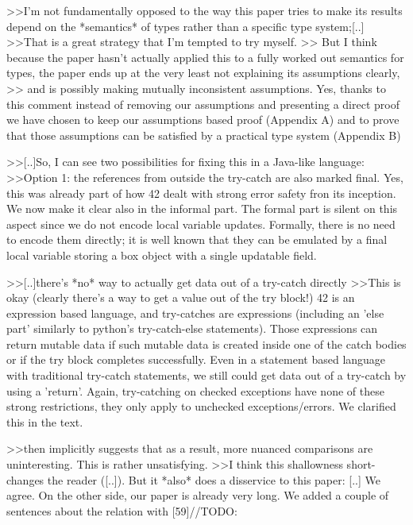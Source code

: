 >>I'm not fundamentally opposed to the way this paper tries to make its results depend on the *semantics* of types rather than a specific type system;[..]
>>That is a great strategy that I'm tempted to try myself.
>> But I think because the paper hasn't actually applied this to a fully worked out semantics for types, the paper ends up at the very least not explaining its assumptions clearly,
>> and is possibly making mutually inconsistent assumptions. 
Yes, thanks to this comment instead of removing our assumptions and presenting a direct proof we have chosen to keep our assumptions based proof (Appendix A)
and to prove that those assumptions can be satisfied by a practical type system (Appendix B)


>>[..]So, I can see two possibilities for fixing this in a Java-like language:
>>Option 1: the references from outside the try-catch are also marked final.
Yes, this was already part of how 42 dealt with strong error safety fron its inception. We now make it clear also in the informal part.
The formal part is silent on this aspect since we do not encode local variable updates.
Formally, there is no need to encode them directly; it is well known that they can be emulated by a final local variable storing a box object with a single updatable field.


>>[..]there's *no* way to actually get data out of a try-catch directly
>>This is okay (clearly there's a way to get a value out of the try block!)
42 is an expression based language, and try-catches are expressions (including an 'else part' similarly to python's try-catch-else statements).
Those expressions can return mutable data if such mutable data is created inside one of the catch bodies or if the try block completes successfully.
Even in a statement based language with traditional try-catch statements, we still could get data out of a try-catch by using a 'return'.
Again, try-catching on checked exceptions have none of these strong restrictions, they only apply to unchecked exceptions/errors.
We clarified this in the text.

>>then implicitly suggests that as a result, more nuanced comparisons are uninteresting. This is rather unsatisfying.
>>I think this shallowness short-changes the reader ([..]). But it *also* does a disservice to this paper: [..]
We agree. On the other side, our paper is already very long.
We added a couple of sentences about the relation with [59]//TODO:


